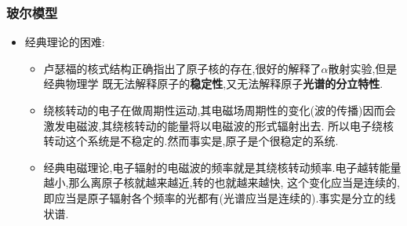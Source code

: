 \documentclass{article}
\begin{document}
\vspace{2em}

\subsubsection{玻尔模型}
\begin{itemize}
    \item 经典理论的困难:
          \begin{itemize}
              \item 卢瑟福的核式结构正确指出了原子核的存在,很好的解释了$\alpha$散射实验,但是经典物理学
                    既无法解释原子的\textbf{稳定性},又无法解释原子\textbf{光谱的分立特性}.
              \item 绕核转动的电子在做周期性运动,其电磁场周期性的变化(波的传播)因而会激发电磁波,其绕核转动的能量将以电磁波的形式辐射出去.
                    所以电子绕核转动这个系统是不稳定的.然而事实是,原子是个很稳定的系统.
              \item 经典电磁理论,电子辐射的电磁波的频率就是其绕核转动频率.电子越转能量越小,那么离原子核就越来越近,转的也就越来越快,
                    这个变化应当是连续的,即应当是原子辐射各个频率的光都有(光谱应当是连续的).事实是分立的线状谱.
          \end{itemize}


\end{itemize}
\end{document}
